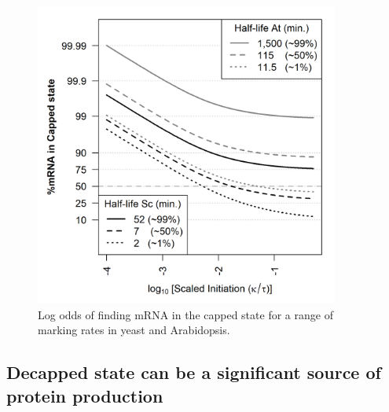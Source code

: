 \documentclass[review]{elsarticle}
\newcommand{\imax}{\ensuremath{{i_{\max}}}\xspace}
\begin{document}
\begin{figure}[!ht]
\centering
\includegraphics[width=100mm]{Images/2023-07-13_logodds.png}
\caption{Log odds of finding mRNA in the capped state for a range of marking rates in yeast and Arabidopsis. }
\end{figure}
\clearpage


\subsection{Decapped state can be a significant source of protein production}
\end{document}

